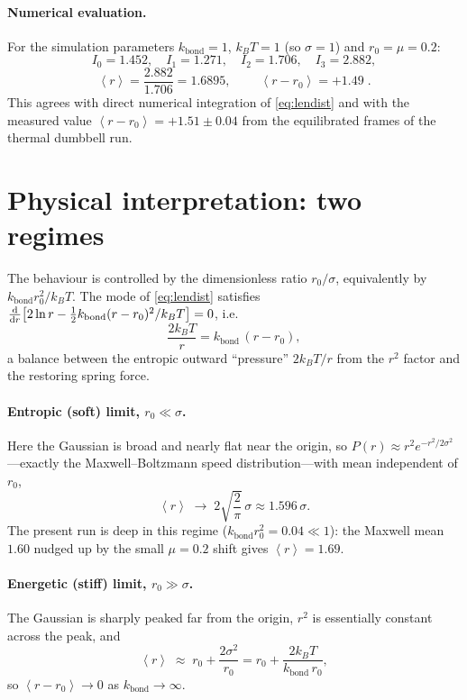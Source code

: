 \documentclass[11pt]{article}
\newcommand{\kT}{k_{B}T}
\newcommand{\kbond}{k_{\mathrm{bond}}}
\newcommand{\rzero}{r_{0}}
\newcommand{\avg}[1]{\left\langle #1 \right\rangle}
\begin{document}
\paragraph{Numerical evaluation.}
For the simulation parameters $\kbond=1$, $\kT=1$ (so $\sigma=1$) and
$\rzero=\mu=0.2$:
\begin{equation}
  I_{0}=1.452,\quad I_{1}=1.271,\quad I_{2}=1.706,\quad I_{3}=2.882,
\end{equation}
\begin{equation}
  \avg{r}=\frac{2.882}{1.706}=1.6895,
  \qquad
  \boxed{\;\avg{r-\rzero}=+1.49\;.}
\end{equation}
This agrees with direct numerical integration of \eqref{eq:lendist} and with the
measured value $\avg{r-\rzero}=+1.51\pm0.04$ from the equilibrated frames of the
thermal dumbbell run.

\section{Physical interpretation: two regimes}

The behaviour is controlled by the dimensionless ratio $\rzero/\sigma$, equivalently
by $\kbond\rzero^{2}/\kT$. The mode of \eqref{eq:lendist} satisfies
$\dv{r}\!\left[2\ln r-\tfrac{1}{2}\kbond(r-\rzero)^{2}/\kT\right]=0$, i.e.
\begin{equation}
  \frac{2\kT}{r}=\kbond\,(r-\rzero),
  \label{eq:balance}
\end{equation}
a balance between the entropic outward ``pressure'' $2\kT/r$ from the $r^{2}$ factor
and the restoring spring force.

\paragraph{Entropic (soft) limit, $\rzero\ll\sigma$.}
Here the Gaussian is broad and nearly flat near the origin, so
$P(r)\approx r^{2}e^{-r^{2}/2\sigma^{2}}$---exactly the Maxwell--Boltzmann speed
distribution---with mean independent of $\rzero$,
\begin{equation}
  \avg{r}\;\longrightarrow\; 2\sqrt{\frac{2}{\pi}}\,\sigma\approx 1.596\,\sigma.
\end{equation}
The present run is deep in this regime ($\kbond\rzero^{2}=0.04\ll1$): the Maxwell
mean $1.60$ nudged up by the small $\mu=0.2$ shift gives $\avg{r}=1.69$.

\paragraph{Energetic (stiff) limit, $\rzero\gg\sigma$.}
The Gaussian is sharply peaked far from the origin, $r^{2}$ is essentially constant
across the peak, and
\begin{equation}
  \avg{r}\;\approx\;\rzero+\frac{2\sigma^{2}}{\rzero}
        =\rzero+\frac{2\kT}{\kbond\,\rzero},
\end{equation}
so $\avg{r-\rzero}\to0$ as $\kbond\to\infty$.
\end{document}
